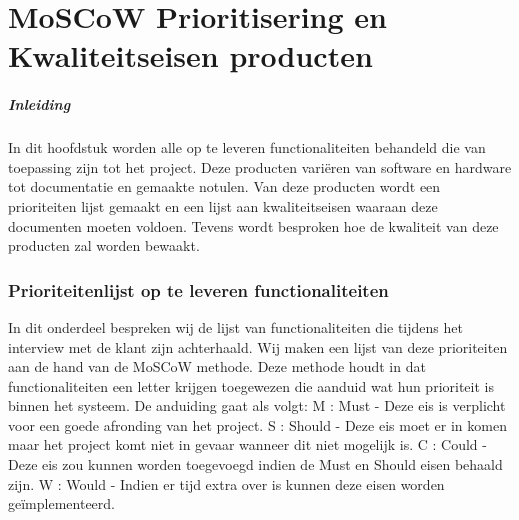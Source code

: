 \chapter{MoSCoW Prioritisering en Kwaliteitseisen producten}
\subtitle{MoSCoW Prioritisering}
\paragraph{Inleiding}
In dit hoofdstuk worden alle op te leveren functionaliteiten behandeld die van toepassing zijn tot het project.
Deze producten variëren van software en hardware tot documentatie en gemaakte notulen.
Van deze producten wordt een prioriteiten lijst gemaakt en een lijst aan kwaliteitseisen waaraan deze documenten moeten voldoen.
Tevens wordt besproken hoe de kwaliteit van deze producten zal worden bewaakt.

\subsection{Prioriteitenlijst op te leveren functionaliteiten}
In dit onderdeel bespreken wij de lijst van functionaliteiten die tijdens het interview met de klant zijn achterhaald.
Wij maken een lijst van deze prioriteiten aan de hand van de MoSCoW methode. Deze methode houdt in dat functionaliteiten een letter krijgen toegewezen die aanduid wat hun prioriteit is binnen het systeem.
De anduiding gaat als volgt: 
M : Must - Deze eis is verplicht voor een goede afronding van het project.
S : Should - Deze eis moet er in komen maar het project komt niet in gevaar wanneer dit niet mogelijk is.
C : Could - Deze eis zou kunnen worden toegevoegd indien de Must en Should eisen behaald zijn.
W : Would - Indien er tijd extra over is kunnen deze eisen worden geïmplementeerd.

